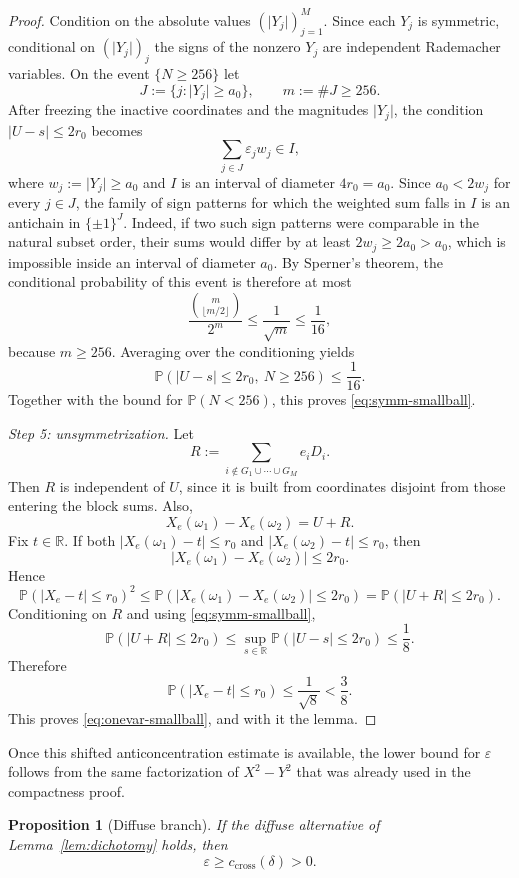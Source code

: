 \documentclass[11pt]{amsart}
\numberwithin{equation}{section}
\newtheorem{proposition}[theorem]{Proposition}
\theoremstyle{definition}
\theoremstyle{remark}
\newcommand{\Prob}{\mathbb P}
\newcommand{\R}{\mathbb R}
\newcommand{\eps}{\varepsilon}
\newcommand{\abs}[1]{\lvert #1 \rvert}
\begin{document}
\begin{proof}
Condition on the absolute values $(\abs{Y_j})_{j=1}^M$.  Since each $Y_j$ is
symmetric, conditional on $(\abs{Y_j})_j$ the signs of the nonzero $Y_j$ are
independent Rademacher variables.  On the event $\{N\ge256\}$ let
\[
J:=\{j:\abs{Y_j}\ge a_0\},
\qquad
m:=\#J\ge256.
\]
After freezing the inactive coordinates and the magnitudes $\abs{Y_j}$, the
condition $\abs{U-s}\le 2r_0$ becomes
\[
\sum_{j\in J}\varepsilon_j w_j \in I,
\]
where $w_j:=\abs{Y_j}\ge a_0$ and $I$ is an interval of diameter
$4r_0=a_0$.  Since $a_0<2w_j$ for every $j\in J$, the family of sign patterns
for which the weighted sum falls in $I$ is an antichain in $\{\pm1\}^J$.
Indeed, if two such sign patterns were comparable in the natural subset order,
their sums would differ by at least $2w_j\ge2a_0>a_0$, which is impossible
inside an interval of diameter $a_0$.  By Sperner's theorem, the conditional
probability of this event is therefore at most
\[
\frac{\binom{m}{\lfloor m/2\rfloor}}{2^m}
\le \frac1{\sqrt m}
\le \frac1{16},
\]
because $m\ge256$.  Averaging over the conditioning yields
\[
\Prob(\abs{U-s}\le 2r_0,\ N\ge256)\le \frac1{16}.
\]
Together with the bound for $\Prob(N<256)$, this proves
\eqref{eq:symm-smallball}.

\smallskip
\noindent\emph{Step 5: unsymmetrization.}
Let
\[
R:=\sum_{i\notin G_1\cup\cdots\cup G_M} e_iD_i.
\]
Then $R$ is independent of $U$, since it is built from coordinates disjoint
from those entering the block sums.  Also,
\[
X_e(\omega_1)-X_e(\omega_2)=U+R.
\]
Fix $t\in\R$.  If both $\abs{X_e(\omega_1)-t}\le r_0$ and
$\abs{X_e(\omega_2)-t}\le r_0$, then
\[
\abs{X_e(\omega_1)-X_e(\omega_2)}\le 2r_0.
\]
Hence
\[
\Prob(\abs{X_e-t}\le r_0)^2
\le
\Prob(\abs{X_e(\omega_1)-X_e(\omega_2)}\le 2r_0)
=
\Prob(\abs{U+R}\le 2r_0).
\]
Conditioning on $R$ and using \eqref{eq:symm-smallball},
\[
\Prob(\abs{U+R}\le 2r_0)
\le
\sup_{s\in\R}\Prob(\abs{U-s}\le 2r_0)
\le \frac18.
\]
Therefore
\[
\Prob(\abs{X_e-t}\le r_0)\le \frac1{\sqrt8}<\frac38.
\]
This proves \eqref{eq:onevar-smallball}, and with it the lemma.
\end{proof}

Once this shifted anticoncentration estimate is available, the lower bound for
$\eps$ follows from the same factorization of $X^2-Y^2$ that was
already used in the compactness proof.

\begin{proposition}[Diffuse branch]\label{prop:diffuse}
If the diffuse alternative of Lemma~\ref{lem:dichotomy} holds, then
\[
\eps\ge c_{\mathrm{cross}}(\delta)>0.
\]
\end{proposition}
\end{document}
